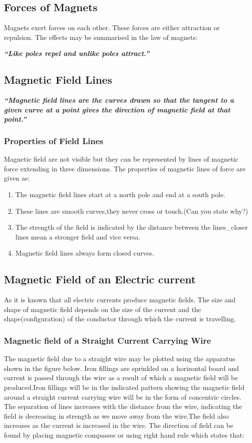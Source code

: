 \subsection{Forces of Magnets}
Magnets exert forces on each other. These forces are either attraction or repulsion. The effects may be summarised in the law of magnets:

\textit{\textbf{“Like poles repel and unlike poles attract.”}}
\subsection{Magnetic Field Lines}
\textit{\textbf{“Magnetic field lines are the curves drawn so that the tangent to a given curve at a point gives the direction of magnetic field at that point.”}}
\subsubsection{Properties of Field Lines}
Magnetic field are not visible but they can be represented by lines of magnetic force extending in three dimensions. The properties of magnetic lines of force are given as:
\begin{enumerate}[label = (\roman*)]
    \item The magnetic field lines start at a north pole and end at a south pole.
    \item These lines are smooth curves,they never cross or touch.(Can you state why?)
    \item The strength of the field is indicated by the distance between the lines\_closer lines mean a stronger field and vice versa.
    \item Magnetic field lines always form closed curves.
\end{enumerate}



\subsection{Magnetic Field of an Electric current}
As it is known that all electric currents produce magnetic fields. The size and shape of magnetic field depends on the size of the current and the shape(configuration) of the conductor through which the current is travelling.

\subsubsection{Magnetic field of a Straight Current Carrying Wire}
The magnetic field due to a straight wire may be plotted using the apparatus shown in the figure below. Iron fillings are sprinkled on a horizontal board and current is passed through the wire as a result of which a magnetic field will be produced.Iron fillings will be in the indicated pattern showing the magnetic field around a straight current carrying wire will be in the form of concentric circles.
The separation of lines increases with the distance from the wire,
indicating the field is decreasing in strength as we move away from the wire.The field also increases as the current is increased in the wire. The direction of field can be found by placing magnetic compasses or using right hand rule which states that:

